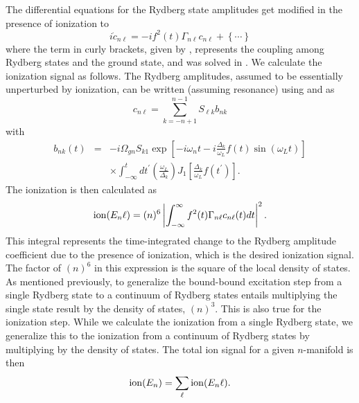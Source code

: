The differential equations for the Rydberg state amplitudes get modified in
the presence of ionization to
\begin{equation}
i\dot{c}_{n \ell} = -if^2(t)\Gamma_{n \ell} c_{n \ell} + \left\{\cdots \right\}
\end{equation}
where the term in curly brackets, given by , represents the
coupling among Rydberg states and the ground state, and was solved in
. We calculate the ionization signal as follows.  The
Rydberg amplitudes, assumed to be essentially unperturbed by ionization,  can be
written (assuming resonance) using  and  as
\begin{equation}
c_{n\ell} = \sum_{k=-n+1}^{n-1} S_{\ell k} b_{nk}
\end{equation}
with
\begin{eqnarray}
b_{nk}(t)&=&-i \Omega_{gn} S_{k1} \exp \left[-i\omega_n t -i
\frac{\Delta_k}{\omega_L} f(t)
\sin (\omega_L t)\right] \nonumber \\ 
&& \times \int_{-\infty}^{t} dt^{'} \left(\frac{\omega_L}{\Delta_k}\right)
 J_{1} \left[\frac{\Delta_k}{\omega_L}
f\left(t^{'}\right) \right].
\end{eqnarray}
The ionization is then calculated as
\begin{equation}
{\rm ion}(E_n \ell) =(n)^6\left| \int_{-\infty}^{\infty} f^2(t)\Gamma_{n
\ell} c_{n \ell}(t) dt \right|^2.
\label{ion_nl}
\end{equation}
This integral represents the time-integrated change to the Rydberg amplitude
coefficient due to the presence of ionization, which is the desired ionization
signal.  The factor of $(n)^6$ in this expression is the square of the local
density of states.  As mentioned previously, to generalize the
bound-bound excitation step from a single Rydberg state to a continuum of
Rydberg states entails multiplying the single state result by the density of
states, $(n)^3$.  This is also true for the ionization step.  While we
calculate the ionization from a single Rydberg state, we generalize this to the
ionization from a continuum of Rydberg states by multiplying by the density of
states.  The total ion signal for a given $n$-manifold is then
\begin{equation}
{\rm ion}(E_n) = \sum_{\ell} {\rm ion}(E_n \ell).
\end{equation}

